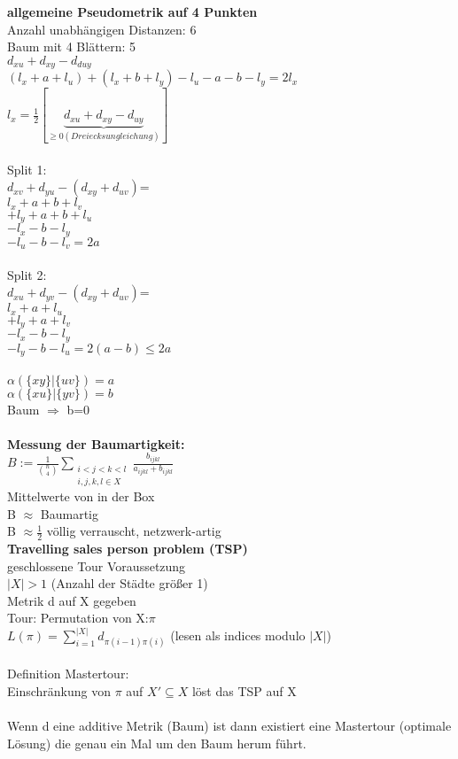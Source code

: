 \documentclass[12pt,a4paper]{article}
\begin{document}
\textbf{allgemeine Pseudometrik auf 4 Punkten}\\
Anzahl unabhängigen Distanzen: 6\\
Baum mit 4 Blättern: 5\\
$d_{xu} + d_{xy} - d_{duy}$\\
$(l_x+a+l_u)+(l_x+b+l_y)-l_u-a-b-l_y=2l_x$\\
$l_x=\frac{1}{2}[\underbrace{d_{xu}+d_{xy}-d_{uy}}_{\geq 0 (Dreiecksungleichung)}]$\\\\
Split 1:\\
$d_{xv}+d_{yu}-(d_{xy}+d_{uv})$=\\
$l_x+a+b+l_v$\\
$+l_y+a+b+l_u$\\
$-l_x-b-l_y$\\
$-l_u-b-l_v=2a$\\\\
Split 2:\\
$d_{xu}+d_{yv}-(d_{xy}+d_{uv})$=\\
$l_x+a+l_u$\\
$+l_y+a+l_v$\\
$-l_x-b-l_y$\\
$-l_y-b-l_u=2(a-b) \leq 2a$\\\\

$\alpha(\{xy\}|\{uv\})=a$\\
$\alpha(\{xu\}|\{yv\})=b$\\
Baum $\Rightarrow$ b=0\\\\

\textbf{Messung der Baumartigkeit:}\\
$B:=\frac{1}{\binom{n}{4}} \displaystyle\sum_{\substack{i<j<k<l \\ i,j,k,l \in X}} \frac{b_{ijkl}}{a_{ijkl} + b_{ijkl}}$\\
Mittelwerte von in der Box\\
B $\approx$ Baumartig\\
B $\approx \frac{1}{2}$ völlig verrauscht, netzwerk-artig\\

\textbf{Travelling sales person problem (TSP)}\\
geschlossene Tour Voraussetzung\\
$|X|>1$ (Anzahl der Städte größer 1)\\
Metrik d auf X gegeben\\
Tour: Permutation von X:$\pi$\\
$L(\pi)=\displaystyle\sum_{i=1}^{|X|}d_{\pi(i-1)\pi(i)}$ (lesen als indices modulo $|X|$)
\\\\
Definition Mastertour:\\
Einschränkung von $\pi$ auf $X'\subseteq X$ löst das TSP auf X\\\\
Wenn d eine additive Metrik (Baum) ist dann existiert eine Mastertour (optimale Lösung) die genau ein Mal um den Baum herum führt.\\
\end{document}
